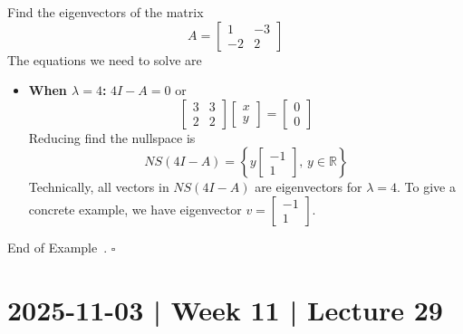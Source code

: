 \documentclass[10pt]{article}
\theoremstyle{definition}
\newtheorem{example}[theorem]{Example}
\renewenvironment{example}
{\begin{oldexample}}
  {\par\smallskip\hfill   End of Example~\theexample. $\square$    \par\end{oldexample}}
\newcommand{\R}{\mathbb{R}}           %
\begin{document}
\begin{example}
  Find the eigenvectors of the matrix
  \begin{equation*}
    A=
    \begin{bmatrix}
      1&-3\\
      -2&2
    \end{bmatrix}
  \end{equation*}
  The equations we need to solve are
  \begin{itemize}
    \item \textbf{When $\lambda=4$:} $4I-A=0$ or
    \begin{equation*}
      \begin{bmatrix}
        3&3\\
        2&2
      \end{bmatrix}
      \begin{bmatrix}
        x\\y
      \end{bmatrix}
      =
      \begin{bmatrix}
        0\\0
      \end{bmatrix}
    \end{equation*}
    Reducing find the nullspace is
    \begin{equation*}
      NS(4I-A) = \left\{y 
        \begin{bmatrix}
          -1\\1
        \end{bmatrix}, \, y\in \R
      \right\} 
    \end{equation*}
    Technically, all vectors in $NS(4I-A)$ are eigenvectors for $\lambda=4$.
    To give a concrete example, we have eigenvector $v=
    \begin{bmatrix}
      -1\\1
    \end{bmatrix}$.
    
  \end{itemize}
\end{example}
\newpage
\section{2025-11-03 | Week 11 | Lecture 29}
\end{document}
